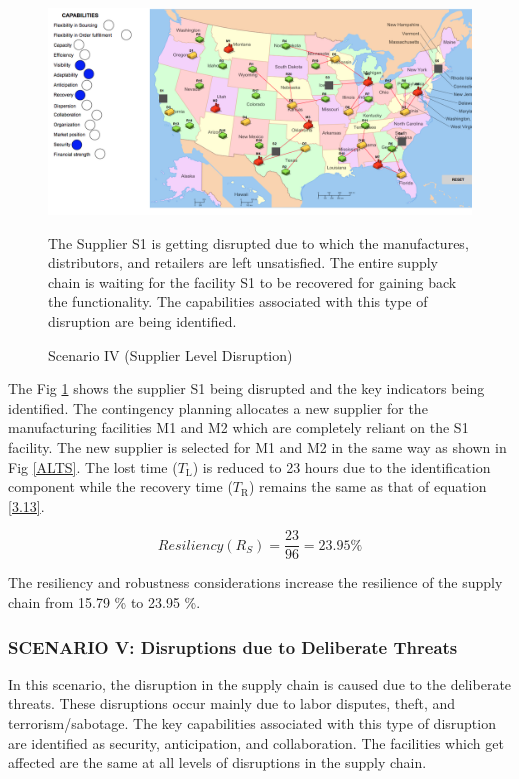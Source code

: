 \begin{figure}[H]
  \centering
  \includegraphics[width=6.5in]{figures/pdf/S4SLD.png}\\
  \caption{Scenario IV (Supplier Level Disruption)}
  {The Supplier S1 is getting disrupted due to which the manufactures, distributors, and retailers are left unsatisfied. The entire supply chain is waiting for the facility S1 to be recovered for gaining back the functionality. The capabilities associated with this type of disruption are being identified.}
  \label{S4SL}
\end{figure}  

The Fig \ref{S4SL} shows the supplier S1 being disrupted and the key indicators being identified. The contingency planning allocates a new supplier for the manufacturing facilities M1 and M2 which are completely reliant on the S1 facility. The new supplier is selected for M1 and M2 in the same way as shown in Fig \ref{ALTS}. The lost time ($T_{\text{L}}$) is reduced to 23 hours due to the identification component while the recovery time ($T_{\text{R}}$) remains the same as that of equation \ref{3.13}.

\begin{equation}
    Resiliency(R_S) = \frac{23}{96} = 23.95 \% \label{3.28}
\end{equation}

The resiliency and robustness considerations increase the resilience of the supply chain from 15.79 \% to 23.95 \%.

\subsubsection{SCENARIO V: Disruptions due to Deliberate Threats}

In this scenario, the disruption in the supply chain is caused due to the deliberate threats. These disruptions occur mainly due to labor disputes, theft, and terrorism/sabotage. The key capabilities associated with this type of disruption are identified as security, anticipation, and collaboration. The facilities which get affected are the same at all levels of disruptions in the supply chain.

